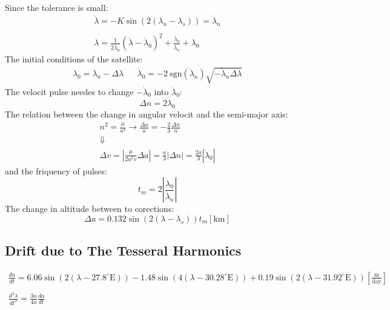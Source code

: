 \documentclass[12pt, a4paper]{article}
\begin{document}
Since the tolerance is small:
\begin{equation}
    \begin{array}{c}
        \ddot{\lambda}=-K\sin\left(2\left(\lambda_n-\lambda_s\right)\right)=\ddot{\lambda}_n \\\\
        \lambda=\displaystyle\frac{1}{2\ddot{\lambda}_n}\left(\dot{\lambda}-\dot{\lambda}_0\right)^2+\frac{\dot{\lambda}_0}{\ddot{\lambda}_n}+\lambda_0
    \end{array}
\end{equation}
The initial conditions of the satellite:
\begin{equation}
    \begin{matrix}
        \lambda_0=\lambda_n-\Delta\lambda && \dot{\lambda}_0=-2\mathrm{\ sgn}\left(\ddot{\lambda}_n\right)\sqrt{-\ddot{\lambda}_n\Delta\lambda}
    \end{matrix}
\end{equation}
The velocit pulse needes to change $-\dot{\lambda}_0$ into $\dot{\lambda}_0$:
\begin{equation}
    \Delta n=2\dot{\lambda}_0
\end{equation}
The relation between the change in angular velocit and the semi-major axis:
\begin{equation}
    \begin{array}{c}
        \displaystyle n^2=\frac{\mu}{a^3}\rightarrow\frac{\Delta a}{a}=-\frac{2}{3}\frac{\Delta n}{n} \\
        \Downarrow \\
        \displaystyle \Delta v=\left|\frac{\mu}{2a^2v}\Delta a\right|=\frac{a}{3}\left|\Delta n\right|=\frac{2a}{3}\left|\dot{\lambda}_0\right|
    \end{array}
\end{equation}
and the friquency of pulses:
\begin{equation}
    t_m=2\left|\frac{\dot{\lambda}_0}{\ddot{\lambda}_n}\right|
\end{equation}
The change in altitude between to corections:
\begin{equation}
    \Delta a=0.132\sin\left(2\left(\lambda-\lambda_s\right)\right)t_m\left[\mathrm{km}\right]
\end{equation}

\subsection{Drift due to The Tesseral Harmonics}
\begin{equation}
    \begin{array}{l}
        \displaystyle\frac{da}{dt}=6.06\sin\left(2\left(\lambda-27.8^\circ\mathrm{E}\right)\right)-1.48\sin\left(4\left(\lambda-30.28^\circ\mathrm{E}\right)\right)+0.19\sin\left(2\left(\lambda-31.92^\circ\mathrm{E}\right)\right)\left[\frac{\mathrm{m}}{\mathrm{day}}\right] \\\\
        \displaystyle\frac{d^2\lambda}{dt^2}=\frac{3n}{4a}\frac{da}{dt}
    \end{array}
\end{equation}
\end{document}
